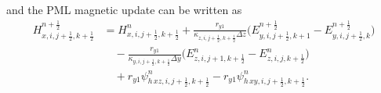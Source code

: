 \documentclass{article}
\numberwithin{equation}{section}
\numberwithin{figure}{section}
\begin{document}
and the PML magnetic update can be written as
\begin{equation}
    \begin{aligned}
        H_{x,i,j+\tfrac12,k+\tfrac12}^{n+\frac12}
         & = H_{x,i,j+\tfrac12,k+\tfrac12}^{n}
        +\frac{r_{y1}}{\kappa_{z,i,j+\tfrac12,k+\tfrac12}\Delta z}
        \Big(E_{y,i,j+\tfrac12,k+1}^{n+\frac12}-E_{y,i,j+\tfrac12,k}^{n+\frac12}\Big) \\
         & \quad
        -\frac{r_{y1}}{\kappa_{y,i,j+\tfrac12,k+\tfrac12}\Delta y}
        \Big(E_{z,i,j+1,k+\tfrac12}^{n}-E_{z,i,j,k+\tfrac12}^{n}\Big)                 \\
         & \quad
        +r_{y1}\psi^{n}_{h\,xz,i,j+\tfrac12,k+\tfrac12}
        -r_{y1}\psi^{n}_{h\,xy,i,j+\tfrac12,k+\tfrac12}.
    \end{aligned}
    \label{eq:adi-first-hx-pml}
\end{equation}
\end{document}
